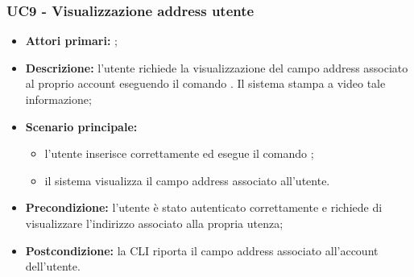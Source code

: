 \subsubsection{UC9 - Visualizzazione address utente}
\begin{itemize}
	\item \textbf{Attori primari:} \ua{};
	\item \textbf{Descrizione:} l’utente richiede la visualizzazione del campo address associato al proprio account eseguendo il comando \whoami{}. Il sistema stampa a video tale informazione; 
	\item \textbf{Scenario principale:} 
		\begin{itemize}
			\item l'utente inserisce correttamente ed esegue il comando \whoami{}; 
			\item il sistema visualizza il campo address associato all’utente.
		\end{itemize}
	\item \textbf{Precondizione:} l’utente è stato autenticato correttamente e richiede di visualizzare l’indirizzo associato alla propria utenza;
	\item \textbf{Postcondizione:} la CLI riporta il campo address associato all’account dell’utente.
\end{itemize}